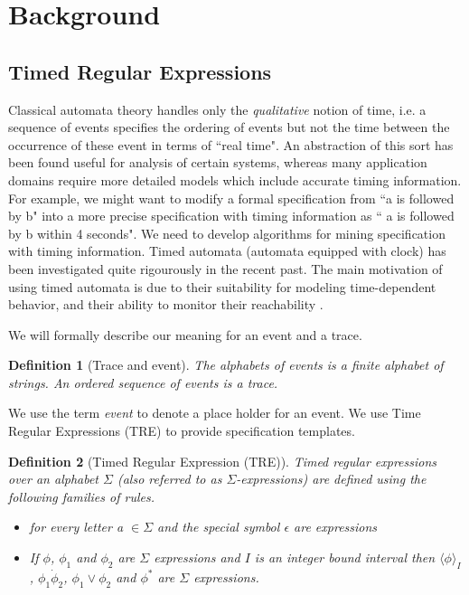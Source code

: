 \documentclass[]{sigplanconf}
\begin{document}
\section{Background} \label{Background}

\subsection{Timed Regular Expressions}
Classical automata theory handles only the \emph{qualitative} notion of time, i.e. a sequence of events specifies the ordering of events but not the time between the occurrence of these event in terms of ``real time". An abstraction of this sort has been found useful for analysis of certain systems, whereas many application domains require more detailed models which include accurate timing information. For example, we might want to modify a formal specification from ``a is followed by b" into a more precise specification with timing information as `` a is followed by b within 4 seconds". We need to develop algorithms for mining specification with timing information. Timed automata \cite{AD94} (automata equipped with clock) has been investigated quite rigourously in the recent past. The main motivation of using timed automata is due to their suitability for modeling time-dependent behavior, and their ability to monitor their reachability \cite{LPY97}.

We will formally describe our meaning for an event and a trace.
\newtheorem{defns}{Definition}

\begin{defns}[Trace and event]
The alphabets of events is a finite alphabet of strings. An ordered sequence of events is a trace.
\end{defns}

We use the term \emph{event} to denote a place holder for an event. We use Time Regular Expressions (TRE) \cite{timedregex} to provide specification templates.

\begin{defns}[Timed Regular Expression (TRE)\cite{timedregex}] Timed regular expressions over an alphabet $\Sigma$ (also referred to as $\Sigma$-expressions) are defined using the following families of rules.
\begin{itemize}
  \item  {} for every letter a $\in \Sigma$ and the special symbol $\epsilon$ are expressions
  \item If $\phi$, $\phi_1$ and $\phi_2$ are $\Sigma$ expressions and $I$ is an integer bound interval then $\langle \phi \rangle_I$, $\phi_1 \dot \phi_2$, $\phi_1 \vee \phi_2$ and $\phi^*$ are $\Sigma$ expressions.
\end{itemize}
\end{defns}
\end{document}

